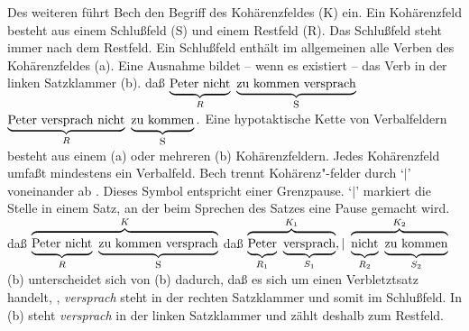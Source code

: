 Des weiteren führt Bech den Begriff des Kohärenzfeldes (K) ein.%
Ein Kohärenzfeld besteht aus einem Schlußfeld (S) und einem Restfeld (R).%
%
%
%
Das Schlußfeld steht immer nach dem Restfeld. Ein Schlußfeld enthält im allgemeinen
alle Verben des Kohärenzfeldes (a). Eine Ausnahme bildet -- wenn es existiert --
das Verb in der linken Satzklammer (b).
\eal
\ex daß ${\underbrace{\rule[-0.5ex]{0cm}{2.5ex}\mbox{Peter nicht}
                              }_{R}~
                   \underbrace{\mbox{zu kommen versprach}
                              }_{\mbox{\footnotesize S}}}$
\ex ${ \underbrace{\mbox{Peter versprach nicht}
                        }_{R}~
             \underbrace{\rule[-0.5ex]{0cm}{2.5ex}\mbox{zu kommen}
                        }_{\mbox{\footnotesize S}}.}$
\zl
Eine hypotaktische Kette von Verbalfeldern besteht aus einem (a) oder mehreren
(b) Kohärenzfeldern. Jedes Kohärenzfeld umfaßt mindestens ein Verbalfeld. Bech trennt
Kohä\-renz"-felder durch `$|$' voneinander ab \citep[\S 77]{Bech55a}. 
%
\is{\textvertline} %
%
Dieses Symbol entspricht einer Grenzpause.
`$|$' markiert die Stelle in einem Satz, an der beim Sprechen des Satzes 
eine Pause gemacht wird.
\eal
\ex daß ${\overbrace{\underbrace{\rule[-0.5ex]{0cm}{2.5ex}{\textrm{Peter~nicht}}
                                         }_{R}~
                   \underbrace{\textrm{zu~kommen~versprach}}_{\mbox{\footnotesize S}}}^{K}}$
%
\ex daß ${\overbrace{\underbrace{\rule[-0.5ex]{0cm}{2.5ex}{\textrm{Peter}}
                                         }_{R_1}~
                              \underbrace{\textrm{versprach}}_{S_1}
                             }^{K_1}, |~
                   \overbrace{\underbrace{\rule[-0.5ex]{0cm}{2.5ex}{\textrm{nicht}}
                                         }_{R_2}~
                              \underbrace{\rule[-0.5ex]{0cm}{2.5ex}{\textrm{zu~kommen}}
                                         }_{S_2}
                             }^{K_2}}$
\zl
(b) unterscheidet sich von (b) dadurch, daß es sich um
einen Verbletztsatz handelt, \dash, \emph{versprach} steht in der rechten Satzklammer und somit im
Schlußfeld. In (b) steht \emph{versprach} in der linken Satzklammer und zählt deshalb zum
Restfeld. 

